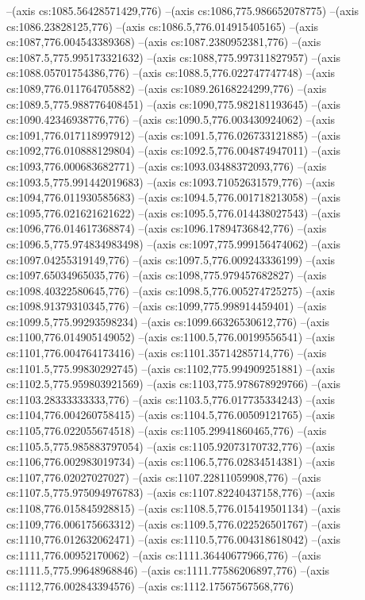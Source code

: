 --(axis cs:1085.56428571429,776)
--(axis cs:1086,775.986652078775)
--(axis cs:1086.23828125,776)
--(axis cs:1086.5,776.014915405165)
--(axis cs:1087,776.004543389368)
--(axis cs:1087.2380952381,776)
--(axis cs:1087.5,775.995173321632)
--(axis cs:1088,775.997311827957)
--(axis cs:1088.05701754386,776)
--(axis cs:1088.5,776.022747747748)
--(axis cs:1089,776.011764705882)
--(axis cs:1089.26168224299,776)
--(axis cs:1089.5,775.988776408451)
--(axis cs:1090,775.982181193645)
--(axis cs:1090.42346938776,776)
--(axis cs:1090.5,776.003430924062)
--(axis cs:1091,776.017118997912)
--(axis cs:1091.5,776.026733121885)
--(axis cs:1092,776.010888129804)
--(axis cs:1092.5,776.004874947011)
--(axis cs:1093,776.000683682771)
--(axis cs:1093.03488372093,776)
--(axis cs:1093.5,775.991442019683)
--(axis cs:1093.71052631579,776)
--(axis cs:1094,776.011930585683)
--(axis cs:1094.5,776.001718213058)
--(axis cs:1095,776.021621621622)
--(axis cs:1095.5,776.014438027543)
--(axis cs:1096,776.014617368874)
--(axis cs:1096.17894736842,776)
--(axis cs:1096.5,775.974834983498)
--(axis cs:1097,775.999156474062)
--(axis cs:1097.04255319149,776)
--(axis cs:1097.5,776.009243336199)
--(axis cs:1097.65034965035,776)
--(axis cs:1098,775.979457682827)
--(axis cs:1098.40322580645,776)
--(axis cs:1098.5,776.005274725275)
--(axis cs:1098.91379310345,776)
--(axis cs:1099,775.998914459401)
--(axis cs:1099.5,775.99293598234)
--(axis cs:1099.66326530612,776)
--(axis cs:1100,776.014905149052)
--(axis cs:1100.5,776.00199556541)
--(axis cs:1101,776.004764173416)
--(axis cs:1101.35714285714,776)
--(axis cs:1101.5,775.99830292745)
--(axis cs:1102,775.994909251881)
--(axis cs:1102.5,775.959803921569)
--(axis cs:1103,775.978678929766)
--(axis cs:1103.28333333333,776)
--(axis cs:1103.5,776.017735334243)
--(axis cs:1104,776.004260758415)
--(axis cs:1104.5,776.00509121765)
--(axis cs:1105,776.022055674518)
--(axis cs:1105.29941860465,776)
--(axis cs:1105.5,775.985883797054)
--(axis cs:1105.92073170732,776)
--(axis cs:1106,776.002983019734)
--(axis cs:1106.5,776.02834514381)
--(axis cs:1107,776.02027027027)
--(axis cs:1107.22811059908,776)
--(axis cs:1107.5,775.975094976783)
--(axis cs:1107.82240437158,776)
--(axis cs:1108,776.015845928815)
--(axis cs:1108.5,776.015419501134)
--(axis cs:1109,776.006175663312)
--(axis cs:1109.5,776.022526501767)
--(axis cs:1110,776.012632062471)
--(axis cs:1110.5,776.004318618042)
--(axis cs:1111,776.00952170062)
--(axis cs:1111.36440677966,776)
--(axis cs:1111.5,775.99648968846)
--(axis cs:1111.77586206897,776)
--(axis cs:1112,776.002843394576)
--(axis cs:1112.17567567568,776)
